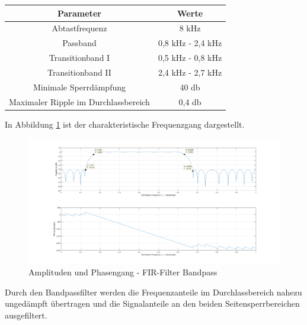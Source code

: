 \begin{table}[H]
	\centering
	\begin{tabular}{c | c}
	Parameter	& Werte	\\
	\hline
	Abtastfrequenz		& 8 kHz\\
	Passband			& 0,8 kHz - 2,4 kHz\\
	Transitionband I	& 0,5 kHz - 0,8 kHz\\
	Transitionband II	& 2,4 kHz - 2,7 kHz\\
	Minimale Sperrdämpfung	& 40 db\\
	Maximaler Ripple im Durchlassbereich	& 0,4 db\\
	
	\end{tabular}
\end{table}





\noindent In Abbildung \ref{fig:Attachment_B_fir_3_Amplitudengang} ist der charakteristische Frequenzgang dargestellt.

\begin{figure}[H]
\centering
\includegraphics[width=0.9\linewidth]{./Bilder/Attachment_B_fir_3_Amplitudengang}
\caption{Amplituden und Phasengang - FIR-Filter Bandpass}
\label{fig:Attachment_B_fir_3_Amplitudengang}
\end{figure}

\noindent Durch den Bandpassfilter werden die Frequenzanteile im Durchlassbereich nahezu ungedämpft übertragen und die Signalanteile an den beiden Seitensperrbereichen ausgefiltert.

